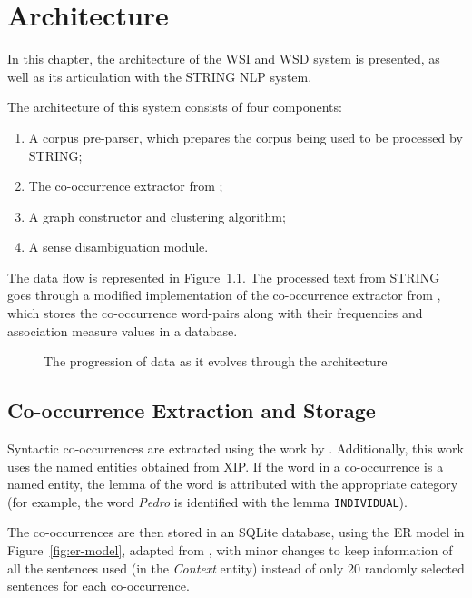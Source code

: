 \chapter{Architecture}
\label{ch:architecture}

In this chapter, the architecture of the \ac{WSI} and \ac{WSD} system is 
presented, as well as its 
articulation with the \ac{STRING} \ac{NLP} system.

The architecture of this system consists of four components:

\begin{enumerate}
  \item A corpus pre-parser, which prepares the corpus being used to be
processed by \ac{STRING};
  \item The co-occurrence extractor from \citet{correia2015syntax};
  \item A graph constructor and clustering algorithm;
  \item A sense disambiguation module.
\end{enumerate}

The data flow is represented in Figure~\ref{fig:data-progression}. The 
processed text from \ac{STRING} 
goes through a modified implementation of the co-occurrence extractor from 
\citet{correia2015syntax}, which stores the co-occurrence word-pairs along with 
their frequencies and association measure values in a database.

\begin{figure}[ht]
 \caption{The progression of data as it evolves through the architecture}
 \label{fig:data-progression}
 \centering
 
\end{figure}

\section{Co-occurrence Extraction and Storage}

Syntactic co-occurrences are extracted using the work by
\citet{correia2015syntax}. Additionally, this work uses the named entities
obtained from \ac{XIP}. If the word in a co-occurrence is a named entity, the
lemma of the word is attributed with the appropriate category (for example, the
word \emph{Pedro} is identified with the lemma \texttt{INDIVIDUAL}).

The co-occurrences are then stored in an SQLite database, using the \ac{ER} model in
Figure~\ref{fig:er-model}, adapted from \citet{correia2015syntax}, with minor 
changes to keep information of all the sentences used (in the \emph{Context}
entity) instead of only 20 randomly selected sentences for each co-occurrence.

